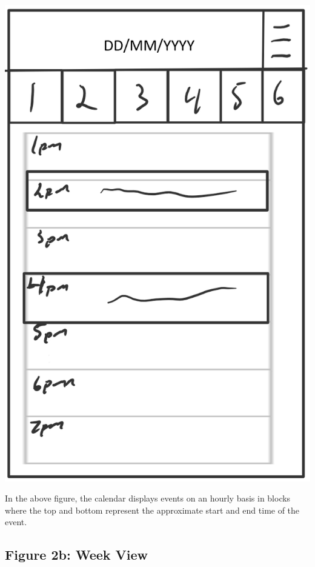 \documentclass{scrreprt}
\begin{document}
\begin{center}
\includegraphics{day.PNG}
\end{center}

In the above figure, the calendar displays events on an hourly basis in blocks where the top and bottom represent the approximate start and end time of the event.

\subsection{Figure 2b: Week View}
\end{document}
